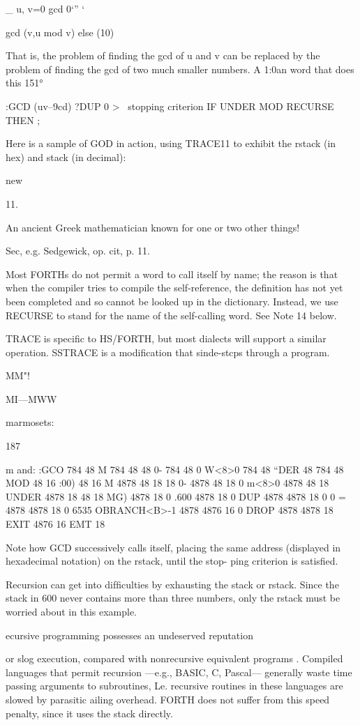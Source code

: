 _ u, v=0
gcd 0‘” ‘ {gcd (v,u mod v) else (10)

That is, the problem of ﬁnding the gcd of u and v can be replaced
by the problem of ﬁnding the gcd of two much smaller numbers.
A 1:0an word that does this 151°

:GCD (uv--9cd)
?DUP 0 > \ stopping criterion
IF UNDER MOD RECURSE THEN ;

Here is a sample of GOD in action, using TRACE11 to exhibit the
rstack (in hex) and stack (in decimal):

 

new

11.

An ancient Greek mathematician known for one or two other things!

Sec, e.g. Sedgewick, op. cit, p. 11.

Most FORTHs do not permit a word to call itself by name; the reason is that when the compiler
tries to compile the self-reference, the deﬁnition has not yet been completed and so cannot be
looked up in the dictionary. Instead, we use RECURSE to stand for the name of the self-calling
word. See Note 14 below.

TRACE is speciﬁc to HS/FORTH, but most dialects will support a similar operation. SSTRACE
is a modiﬁcation that sinde-stcps through a program.

MM"!

MI—MWW

marmosets:

187

m and:
:GCO 784 48
M 784 48 48
0- 784 48 0
W<8>0 784 48
“DER 48 784 48
MOD 48 16
:00) 48 16
M 4878 48 18 18
0- 4878 48 18 0
m<8>0 4878 48 18
UNDER 4878 18 48 18
MG) 4878 18 0
.600 4878 18 0
DUP 4878 4878 18 0 0
= 4878 4878 18 0 6535
OBRANCH<B>-1 4878 4876 16 0
DROP 4878 4878 18
EXIT 4876 16
EMT 18

Note how GCD successively calls itself, placing the same address
(displayed in hexadecimal notation) on the rstack, until the stop-
ping criterion is satisﬁed.

Recursion can get into difﬁculties by exhausting the stack or
rstack. Since the stack in 600 never contains more than three
numbers, only the rstack must be worried about in this example.

ecursive programming possesses an undeserved reputation

or slog execution, compared with nonrecursive equivalent
programs . Compiled languages that permit recursion —e.g.,
BASIC, C, Pascal— generally waste time passing arguments to
subroutines, Le. recursive routines in these languages are slowed
by parasitic ailing overhead. FORTH does not suffer from this
speed penalty, since it uses the stack directly.

}
